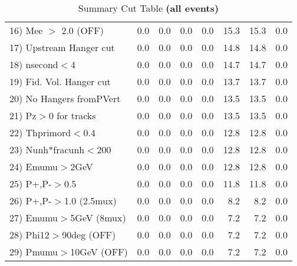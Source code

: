 \begin{table}[h!]
{{\begin{tabular}{||l||r|r|r|r|r||r||r||}
 16) Mee $>$ 2.0  (OFF)   &       0.0 &       0.0 &       0.0 &       0.0 &      15.3 &      15.3 &       0.0 \\
 17) Upstream Hanger cut  &       0.0 &       0.0 &       0.0 &       0.0 &      14.8 &      14.8 &       0.0 \\
 18) nsecond$<$4          &       0.0 &       0.0 &       0.0 &       0.0 &      14.7 &      14.7 &       0.0 \\
 19) Fid. Vol. Hanger cut &       0.0 &       0.0 &       0.0 &       0.0 &      13.7 &      13.7 &       0.0 \\
 20) No Hangers fromPVert &       0.0 &       0.0 &       0.0 &       0.0 &      13.5 &      13.5 &       0.0 \\
 21) Pz$>$0 for tracks    &       0.0 &       0.0 &       0.0 &       0.0 &      13.5 &      13.5 &       0.0 \\
 22) Thprimord$<$0.4      &       0.0 &       0.0 &       0.0 &       0.0 &      12.8 &      12.8 &       0.0 \\
 23) Nunh*fracunh$<$200   &       0.0 &       0.0 &       0.0 &       0.0 &      12.8 &      12.8 &       0.0 \\
 24) Emumu$>$2GeV         &       0.0 &       0.0 &       0.0 &       0.0 &      12.8 &      12.8 &       0.0 \\
 25) P+,P-$>$0.5          &       0.0 &       0.0 &       0.0 &       0.0 &      11.8 &      11.8 &       0.0 \\
 26) P+,P-$>$1.0 (2.5mux) &       0.0 &       0.0 &       0.0 &       0.0 &       8.2 &       8.2 &       0.0 \\
 27) Emumu$>$5GeV  (8mux) &       0.0 &       0.0 &       0.0 &       0.0 &       7.2 &       7.2 &       0.0 \\
 28) Phi12$>$90deg  (OFF) &       0.0 &       0.0 &       0.0 &       0.0 &       7.2 &       7.2 &       0.0 \\
 29) Pmumu$>$10GeV  (OFF) &       0.0 &       0.0 &       0.0 &       0.0 &       7.2 &       7.2 &       0.0 \\
 \hline
 \hline
 \end{tabular}
 \caption{Summary Cut Table \textbf{ (all events)}}
 \label{tab-sumcut}
 }}
 \end{table}
 \endinput
